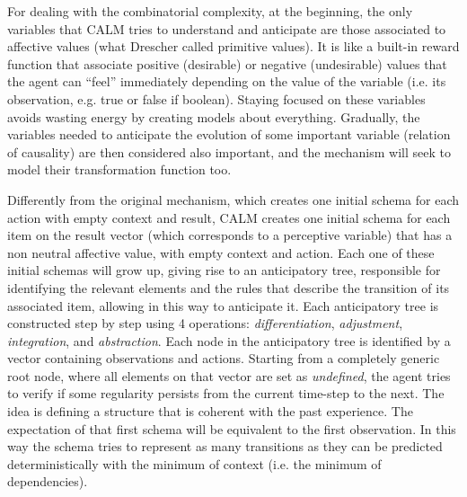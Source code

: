 \documentclass[runningheads]{llncs}
\begin{document}
For dealing with the combinatorial complexity, at the beginning, the only variables that CALM tries to understand and anticipate are those associated to affective values (what Drescher called primitive values).
It is like a built-in reward function that associate positive (desirable) or negative (undesirable) values that the agent can ``feel'' immediately depending on the value of the variable (i.e. its observation, e.g. true or false if boolean).
Staying focused on these variables avoids wasting energy by creating models about everything. 
Gradually, the variables needed to anticipate the evolution of some important variable (relation of causality) are then considered also important, and the mechanism will seek to model their transformation function too.

Differently from the original mechanism, which creates one initial schema for each action with empty context and result, CALM creates one initial schema for each item on the result vector (which corresponds to a perceptive variable) that has	a non neutral affective value, with empty context and action.
Each one of these initial schemas will grow up, giving rise to an anticipatory tree, responsible for identifying the relevant elements and the rules that describe the transition of its associated item, allowing in this way to anticipate it. 
Each anticipatory tree is constructed step by step using 4 operations: \textit{differentiation}, \textit{adjustment}, \textit{integration}, and \textit{abstraction}.
Each node in the anticipatory tree is identified by a vector containing observations and actions. 
Starting from a completely generic root node, where all elements on that vector are set as \textit{undefined}, the agent tries to verify if some regularity persists from the current time-step to the next.
The idea is defining a structure that is coherent with the past experience.
The expectation of that first schema will be equivalent to the first observation. 
In this way the schema tries to represent as many transitions as they can be predicted deterministically with the minimum of context (i.e. the minimum of dependencies).
\end{document}
